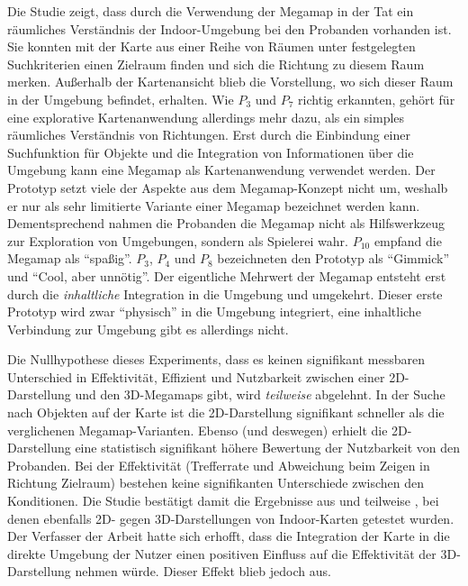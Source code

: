 Die Studie zeigt, dass durch die Verwendung der Megamap in der Tat ein räumliches Verständnis der Indoor-Umgebung bei den Probanden vorhanden ist.
Sie konnten mit der Karte aus einer Reihe von Räumen unter festgelegten Suchkriterien einen Zielraum finden und sich die Richtung zu diesem Raum merken.
Außerhalb der Kartenansicht blieb die Vorstellung, wo sich dieser Raum in der Umgebung befindet, erhalten.
Wie $P_3$ und $P_7$ richtig erkannten, gehört für eine explorative Kartenanwendung allerdings mehr dazu, als ein simples räumliches Verständnis von Richtungen.
Erst durch die Einbindung einer Suchfunktion für Objekte und die Integration von Informationen über die Umgebung kann eine Megamap als Kartenanwendung verwendet werden.
Der Prototyp setzt viele der Aspekte aus dem Megamap-Konzept nicht um, weshalb er nur als sehr limitierte Variante einer Megamap bezeichnet werden kann.
Dementsprechend nahmen die Probanden die Megamap nicht als Hilfswerkzeug zur Exploration von Umgebungen, sondern als Spielerei wahr.
$P_{10}$ empfand die Megamap als \enquote{spaßig}. $P_3$, $P_4$ und $P_8$ bezeichneten den Prototyp als \enquote{Gimmick} und \enquote{Cool, aber unnötig}.
Der eigentliche Mehrwert der Megamap entsteht erst durch die \emph{inhaltliche} Integration in die Umgebung und umgekehrt.
Dieser erste Prototyp wird zwar \enquote{physisch} in die Umgebung integriert, eine inhaltliche Verbindung zur Umgebung gibt es allerdings nicht.

Die Nullhypothese dieses Experiments, dass es keinen signifikant messbaren Unterschied in Effektivität, Effizient und Nutzbarkeit zwischen einer 2D-Darstellung und den 3D-Megamaps gibt, wird \emph{teilweise} abgelehnt.
In der Suche nach Objekten auf der Karte ist die 2D-Darstellung signifikant schneller als die verglichenen Megamap-Varianten.
Ebenso (und deswegen) erhielt die 2D-Darstellung eine statistisch signifikant höhere Bewertung der Nutzbarkeit von den Probanden.
Bei der Effektivität (Trefferrate und Abweichung beim Zeigen in Richtung Zielraum) bestehen keine signifikanten Unterschiede zwischen den Konditionen.
Die Studie bestätigt damit die Ergebnisse aus \autocite{Chittaro2006} und teilweise \autocite{Li2013}, bei denen ebenfalls 2D- gegen 3D-Darstellungen von Indoor-Karten getestet wurden.
Der Verfasser der Arbeit hatte sich erhofft, dass die Integration der Karte in die direkte Umgebung der Nutzer einen positiven Einfluss auf die Effektivität der 3D-Darstellung nehmen würde.
Dieser Effekt blieb jedoch aus.

%
\cleardoublepage
